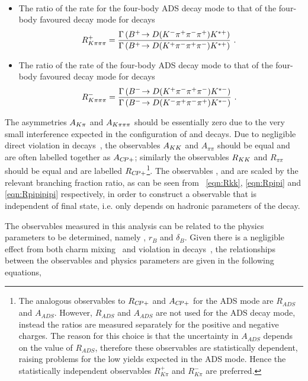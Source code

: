 \begin{itemize}
{{\begin{multline}
\label{eqn:Rpipipipi}
\end{multline}}}
\item{The ratio of the rate for the four-body ADS decay mode to that of the four-body favoured decay mode for \Bp decays
\begin{equation}
R^+_{K\pi\pi\pi} = \frac{\Gamma\left({{{B}^+}}\!\rightarrow {\ensuremath{D}}({{K}^-}{{\pi}^+}{{\pi}^-}{{\pi}^+}){{K}^{*+}}\right)}{\Gamma\left({{{B}^+}}\!\rightarrow {\ensuremath{D}}({{K}^+}{{\pi}^-}{{\pi}^+}{{\pi}^-}){{K}^{*+}}\right)} \text{ . }
\label{eqn:Rplus4body}
\end{equation}
}
\item{The ratio of the rate of the four-body ADS decay mode to that of the four-body favoured decay mode for \Bm decays
\begin{equation}
R^-_{K\pi\pi\pi} = \frac{\Gamma\left({{{B}^-}}\!\rightarrow {\ensuremath{D}}({{K}^+}{{\pi}^-}{{\pi}^+}{{\pi}^-}){{K}^{*-}}\right)}{\Gamma\left({{{B}^-}}\!\rightarrow {\ensuremath{D}}({{K}^-}{{\pi}^+}{{\pi}^-}{{\pi}^+}){{K}^{*-}}\right)} \text{ . }
\label{eqn:Rminus4body}
\end{equation}
}
\end{itemize}

\noindent
The asymmetries $A_{{K}\pi}$ and $A_{{K}\pi\pi\pi}$ should be essentially zero due to the very small interference expected in the configuration of \B and \D decays. Due to negligible direct \CP violation in \D decays~\cite{charmcpv}, the observables $A_{{K}{K}}$ and $A_{\pi\pi}$ should be equal and are often labelled together as $A_{{C\!P}+}$; similarly the observables $R_{{K}{K}}$ and $R_{\pi\pi}$ should be equal and are labelled $R_{{C\!P}+}$\footnote{The analogous observables to $R_{{C\!P}+}$ and $A_{{C\!P}+}$ for the ADS mode are $R_{ADS}$ and $A_{ADS}$. However, $R_{ADS}$ and $A_{ADS}$ are not used for the ADS decay mode, instead the ratios are measured separately for the positive and negative charges. The reason for this choice is that the uncertainty in $A_{ADS}$ depends on the value of $R_{ADS}$, therefore these observables are statistically dependent, raising problems for the low yields expected in the ADS mode. Hence the statistically independent observables $R^+_{K\pi}$ and $R^-_{K\pi}$ are preferred.}. The observables \Rkk, \Rpipi and \Rpipipipi are scaled by the relevant branching fraction ratio, as can be seen from \eqn~\ref{eqn:Rkk}, \ref{eqn:Rpipi} and \ref{eqn:Rpipipipi} respectively, in order to construct a \CP observable that is independent of final state, i.e. only depends on hadronic parameters of the \Bm decay. 

The \CP observables measured in this analysis can be related to the physics parameters to be determined, namely \Pgamma, $r_B$ and $\delta_B$. Given there is a negligible effect from both charm mixing~\cite{charmmixing} and \CP violation in \D decays~\cite{charmcpv}, the relationships between the \CP observables and physics parameters are given in the following equations,

